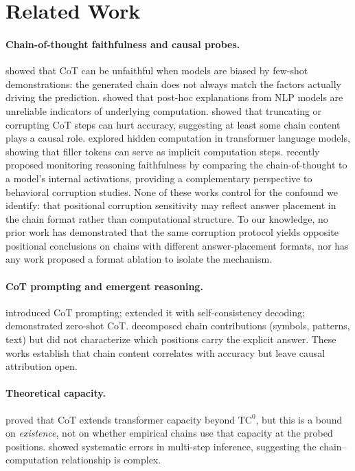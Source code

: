 \documentclass{article}
\theoremstyle{definition}
\theoremstyle{definition}
\begin{document}
\section{Related Work}
\label{sec:related}

\paragraph{Chain-of-thought faithfulness and causal probes.}
\citet{turpin2023} showed that CoT can be unfaithful when models are biased by
few-shot demonstrations: the generated chain does not always match the factors
actually driving the prediction. \citet{ye2022} showed that post-hoc
explanations from NLP models are unreliable indicators of underlying
computation. \citet{lanham2023} showed that truncating or corrupting CoT steps
can hurt accuracy, suggesting at least some chain content plays a causal role.
\citet{pfau2024} explored hidden computation in transformer language models,
showing that filler tokens can serve as implicit computation steps.
\citet{baker2025} recently proposed monitoring reasoning faithfulness
by comparing the chain-of-thought to a model's internal activations,
providing a complementary perspective to behavioral corruption studies.
None of these works control for the confound we identify:
that positional corruption sensitivity may reflect answer placement in the
chain format rather than computational structure. To our knowledge, no
prior work has demonstrated that the same corruption protocol yields
opposite positional conclusions on chains with different answer-placement
formats, nor has any work proposed a format ablation to isolate the
mechanism.

\paragraph{CoT prompting and emergent reasoning.}
\citet{wei2022} introduced CoT prompting; \citet{wang2022} extended it with
self-consistency decoding; \citet{kojima2022} demonstrated zero-shot CoT.
\citet{madaan2022} decomposed chain contributions (symbols, patterns, text)
but did not characterize which positions carry the explicit answer.
These works establish that chain content correlates with accuracy but leave
causal attribution open.

\paragraph{Theoretical capacity.}
\citet{merrill2023} proved that CoT extends transformer capacity beyond
$\mathrm{TC}^0$, but this is a bound on \emph{existence}, not on whether
empirical chains use that capacity at the probed positions.
\citet{saparov2023} showed systematic errors in multi-step inference,
suggesting the chain--computation relationship is complex.
\end{document}
